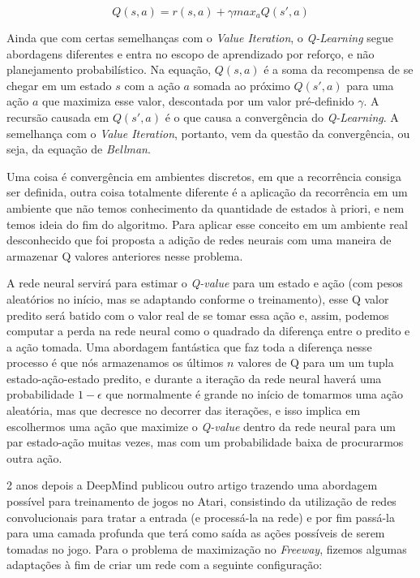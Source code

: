 \documentclass[letterpaper]{article} %
\begin{document}
$$
Q(s,a) = r(s,a) + \gamma max_a Q(s',a)
$$

Ainda que com certas semelhanças com o \textit{Value Iteration}, o \textit{Q-Learning} segue abordagens diferentes e entra no escopo de aprendizado por reforço, e não planejamento probabilístico. Na equação, $Q(s,a)$ é a soma da recompensa de se chegar em um estado $s$ com a ação $a$ somada ao próximo $Q(s',a)$ para uma ação $a$ que maximiza esse valor, descontada por um valor pré-definido $\gamma$. A recursão causada em $Q(s',a)$ é o que causa a convergência do \textit{Q-Learning}. A semelhança com o \textit{Value Iteration}, portanto, vem da questão da convergência, ou seja, da equação de \textit{Bellman}.

Uma coisa é convergência em ambientes discretos, em que a recorrência consiga ser definida, outra coisa totalmente diferente é a aplicação da recorrência em um ambiente que não temos conhecimento da quantidade de estados à priori, e nem temos ideia do fim do algoritmo. Para aplicar esse conceito em um ambiente real desconhecido que foi proposta a adição de redes neurais com uma maneira de armazenar Q valores anteriores nesse problema.

A rede neural servirá para estimar o \textit{Q-value} para um estado e ação (com pesos aleatórios no início, mas se adaptando conforme o treinamento), esse Q valor predito será batido com o valor real de se tomar essa ação e, assim, podemos computar a perda na rede neural como o quadrado da diferença entre o predito e a ação tomada. Uma abordagem fantástica que faz toda a diferença nesse processo é que nós armazenamos os últimos $n$ valores de Q para um um tupla estado-ação-estado predito, e durante a iteração da rede neural haverá uma probabilidade $1-\epsilon$ que normalmente é grande no início de tomarmos uma ação aleatória, mas que decresce no decorrer das iterações, e isso implica em escolhermos uma ação que maximize o \textit{Q-value} dentro da rede neural para um par estado-ação muitas vezes, mas com um probabilidade baixa de procurarmos outra ação.

2 anos depois a DeepMind publicou outro artigo trazendo uma abordagem possível para treinamento de jogos no Atari, consistindo da utilização de redes convolucionais para tratar a entrada (e processá-la na rede) e por fim passá-la para uma camada profunda que terá como saída as ações possíveis de serem tomadas no jogo. Para o problema de maximização no \textit{Freeway}, fizemos algumas adaptações à fim de criar um rede com a seguinte configuração: 
\end{document}
